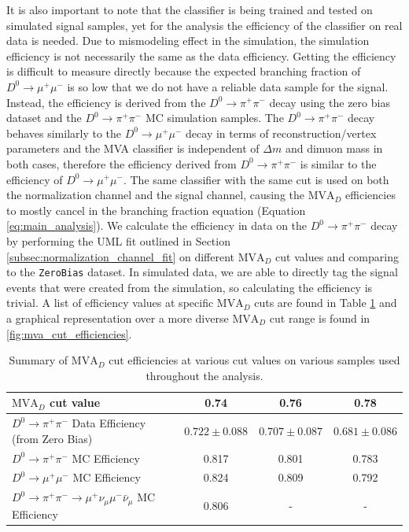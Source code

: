 It is also important to note that the classifier is being trained and tested on simulated signal samples, yet for the analysis the efficiency of the classifier on real data is needed. Due to mismodeling effect in the simulation, the simulation efficiency is not necessarily the same as the data efficiency. Getting the efficiency is difficult to measure directly because the expected branching fraction of $D^0 \to \mu^+ \mu^-$ is so low that we do not have a reliable data sample for the signal. Instead, the efficiency is derived from the $D^0 \to \pi^+ \pi^-$ decay using the zero bias dataset and the $D^0 \to \pi^+ \pi^-$ MC simulation samples. The $D^0 \to \pi^+ \pi^-$ decay behaves similarly to the $D^0 \to \mu^+ \mu^-$ decay in terms of reconstruction/vertex parameters and the MVA classifier is independent of $\Delta m$ and dimuon mass in both cases, therefore the efficiency derived from $D^0 \to \pi^+ \pi^-$ is similar to the efficiency of $D^0 \to \mu^+ \mu^-$. The same classifier with the same cut is used on both the normalization channel and the signal channel, causing the $\text{MVA}_D$ efficiencies to mostly cancel in the branching fraction equation (Equation \ref{eq:main_analysis}). We calculate the efficiency in data on the $D^0 \to \pi^+ \pi^-$ decay by performing the UML fit outlined in Section \ref{subsec:normalization_channel_fit} on different $\text{MVA}_D$ cut values and comparing to the \texttt{ZeroBias} dataset. In simulated data, we are able to directly tag the signal events that were created from the simulation, so calculating the efficiency is trivial. A list of efficiency values at specific $\text{MVA}_D$ cuts are found in Table \ref{tab:mva_cut_efficiencies} and a graphical representation over a more diverse $\text{MVA}_D$ cut range is found in \ref{fig:mva_cut_efficiencies}.

\begin{table}[htbp]
    \centering
    \begin{tabular}{|l|c|c|c|}
    \hline
    $\text{MVA}_D$ cut value & \textbf{0.74} & \textbf{0.76} & \textbf{0.78} \\
    \hline
    $D^0 \to \pi^+ \pi^-$ Data Efficiency (from Zero Bias) & $0.722 \pm 0.088$ & $0.707 \pm 0.087$ & $0.681 \pm 0.086$ \\
    $D^0 \to \pi^+ \pi^-$ MC Efficiency & 0.817 & 0.801 & 0.783 \\
    $D^0 \to \mu^+ \mu^-$ MC Efficiency & 0.824 & 0.809 & 0.792 \\
    $D^0 \to \pi^+ \pi^- \to \mu^+\nu_\mu\mu^-\bar{\nu}_\mu$ MC Efficiency & 0.806 & - & - \\
    \hline
    \end{tabular}
    \caption{Summary of $\text{MVA}_D$ cut efficiencies at various cut values on various samples used throughout the analysis.}
    \label{tab:mva_cut_efficiencies}
\end{table}

